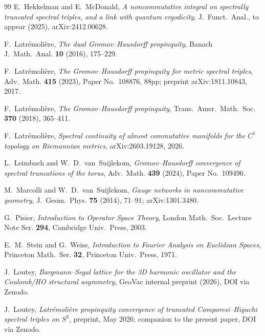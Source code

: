 \documentclass[11pt,a4paper]{article}
\theoremstyle{plain}
\theoremstyle{definition}
\newcommand{\sthree}{S^{3}}
\begin{document}
\begin{thebibliography}{99}
E.~Hekkelman and E.~McDonald,
\newblock \emph{A noncommutative integral on spectrally truncated
spectral triples, and a link with quantum ergodicity},
\newblock J.~Funct.~Anal., to appear (2025), arXiv:2412.00628.

F.~Latr\'emoli\`ere,
\newblock \emph{The dual Gromov--Hausdorff propinquity},
\newblock Banach J.~Math.~Anal. \textbf{10} (2016), 175--229.

F.~Latr\'emoli\`ere,
\newblock \emph{The Gromov--Hausdorff propinquity for metric spectral
triples},
\newblock Adv.~Math. \textbf{415} (2023), Paper No.~108876, 88pp;
\newblock preprint arXiv:1811.10843, 2017.

F.~Latr\'emoli\`ere,
\newblock \emph{The Gromov--Hausdorff propinquity},
\newblock Trans.~Amer.~Math.~Soc. \textbf{370} (2018), 365--411.

F.~Latr\'emoli\`ere,
\newblock \emph{Spectral continuity of almost commutative manifolds for
the $C^1$ topology on Riemannian metrics},
\newblock arXiv:2603.19128, 2026.

L.~Leimbach and W.~D.~van~Suijlekom,
\newblock \emph{Gromov--Hausdorff convergence of spectral truncations
of the torus},
\newblock Adv.~Math. \textbf{439} (2024), Paper No.~109496.

M.~Marcolli and W.~D.~van~Suijlekom,
\newblock \emph{Gauge networks in noncommutative geometry},
\newblock J.~Geom.~Phys. \textbf{75} (2014), 71--91;
\newblock arXiv:1301.3480.

G.~Pisier,
\newblock \emph{Introduction to Operator Space Theory},
\newblock London Math.~Soc.~Lecture Note Ser. \textbf{294}, Cambridge
Univ.~Press, 2003.

E.~M.~Stein and G.~Weiss,
\newblock \emph{Introduction to Fourier Analysis on Euclidean Spaces},
\newblock Princeton Math.~Ser. \textbf{32}, Princeton Univ.~Press, 1971.

J.~Loutey,
\newblock \emph{Bargmann--Segal lattice for the 3D harmonic oscillator
and the Coulomb/HO structural asymmetry},
\newblock GeoVac internal preprint (2026), DOI via Zenodo.

J.~Loutey,
\newblock \emph{Latr\'emoli\`ere propinquity convergence of truncated
Camporesi--Higuchi spectral triples on $\sthree$},
\newblock preprint, May 2026; companion to the present paper, DOI via
Zenodo.

\end{thebibliography}
\end{document}
